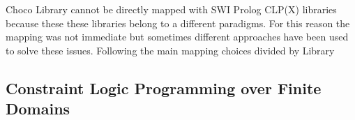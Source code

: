 Choco Library cannot be directly mapped with SWI Prolog CLP(X) libraries
because these these libraries belong to a different paradigms. For this reason the mapping was not immediate but
sometimes different approaches have been used to solve these issues.\newline\newline
Following the main mapping choices divided by Library

\subsection{Constraint Logic Programming over Finite Domains}\label{map_clpfd}







